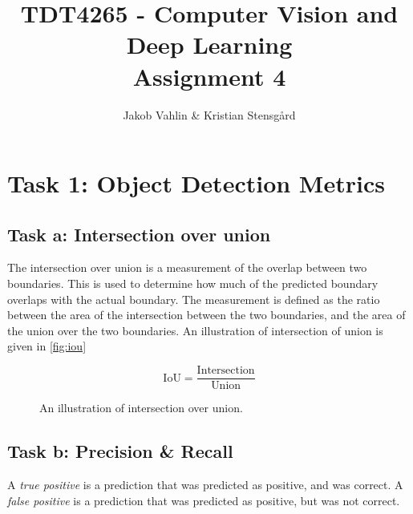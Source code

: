 \documentclass{article}
\date{}
\title{TDT4265 - Computer Vision and Deep Learning \\Assignment 4}
\author{Jakob Vahlin & Kristian Stensgård}
\begin{document}
\maketitle

\tableofcontents
\newpage

\section{Task 1: Object Detection Metrics}
\subsection{Task a: Intersection over union}
The intersection over union is a measurement of the overlap between two boundaries. This is used to determine how much of the predicted boundary overlaps with the actual boundary. The measurement is defined as the ratio between the area of the intersection between the two boundaries, and the area of the union over the two boundaries. An illustration of intersection of union is given in \autoref{fig:iou}

\begin{equation}
    \text{IoU} = \frac{\text{Intersection}}{\text{Union}}
\end{equation}

\begin{figure}[H]
    \centering
    \caption{An illustration of intersection over union.}

    \label{fig:iou}
\end{figure}


\subsection{Task b: Precision \& Recall}
A \textit{true positive} is a prediction that was predicted as positive, and was correct. A \textit{false positive} is a prediction that was predicted as positive, but was not correct.
\end{document}
